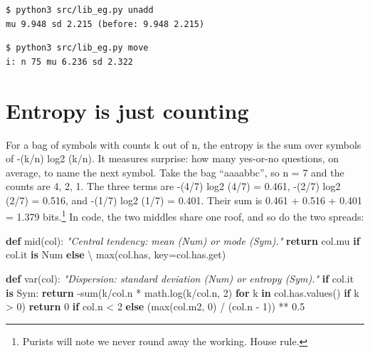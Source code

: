 \documentclass[
  justified]{tufte-book}
\newenvironment{Shaded}{}{}
\newcommand{\BuiltInTok}[1]{\textcolor[rgb]{0.00,0.50,0.00}{#1}}
\newcommand{\CommentTok}[1]{\textcolor[rgb]{0.38,0.63,0.69}{\textit{#1}}}
\newcommand{\ControlFlowTok}[1]{\textcolor[rgb]{0.00,0.44,0.13}{\textbf{#1}}}
\newcommand{\DecValTok}[1]{\textcolor[rgb]{0.25,0.63,0.44}{#1}}
\newcommand{\FloatTok}[1]{\textcolor[rgb]{0.25,0.63,0.44}{#1}}
\newcommand{\KeywordTok}[1]{\textcolor[rgb]{0.00,0.44,0.13}{\textbf{#1}}}
\newcommand{\NormalTok}[1]{#1}
\newcommand{\OperatorTok}[1]{\textcolor[rgb]{0.40,0.40,0.40}{#1}}
\begin{document}
\begin{verbatim}
$ python3 src/lib_eg.py unadd
mu 9.948 sd 2.215 (before: 9.948 2.215)
\end{verbatim}

\begin{verbatim}
$ python3 src/lib_eg.py move
i: n 75 mu 6.236 sd 2.322
\end{verbatim}

\section{Entropy is just counting}\label{entropy-is-just-counting}

For a bag of symbols with counts k out of n, the entropy is the sum over
symbols of -(k/n) log2 (k/n). It measures surprise: how many yes-or-no
questions, on average, to name the next symbol. Take the bag
``aaaabbc'', so n = 7 and the counts are 4, 2, 1. The three terms are
-(4/7) log2 (4/7) = 0.461, -(2/7) log2 (2/7) = 0.516, and -(1/7) log2
(1/7) = 0.401. Their sum is 0.461 + 0.516 + 0.401 = 1.379
bits.\footnote{Purists will note we never round away the working. House
  rule.} In code, the two middles share one roof, and so do the two
spreads:

\begin{Shaded}
\begin{Highlighting}[]
\KeywordTok{def}\NormalTok{ mid(col):}
  \CommentTok{"Central tendency: mean (Num) or mode (Sym)."}
  \ControlFlowTok{return}\NormalTok{ col.mu }\ControlFlowTok{if}\NormalTok{ col.it }\KeywordTok{is}\NormalTok{ Num }\ControlFlowTok{else} \OperatorTok{\textbackslash{}}
         \BuiltInTok{max}\NormalTok{(col.has, key}\OperatorTok{=}\NormalTok{col.has.get)}
\end{Highlighting}
\end{Shaded}

\begin{Shaded}
\begin{Highlighting}[]
\KeywordTok{def}\NormalTok{ var(col):}
  \CommentTok{"Dispersion: standard deviation (Num) or entropy (Sym)."}
  \ControlFlowTok{if}\NormalTok{ col.it }\KeywordTok{is}\NormalTok{ Sym:}
    \ControlFlowTok{return} \OperatorTok{{-}}\BuiltInTok{sum}\NormalTok{(k}\OperatorTok{/}\NormalTok{col.n }\OperatorTok{*}\NormalTok{ math.log(k}\OperatorTok{/}\NormalTok{col.n, }\DecValTok{2}\NormalTok{)}
                \ControlFlowTok{for}\NormalTok{ k }\KeywordTok{in}\NormalTok{ col.has.values() }\ControlFlowTok{if}\NormalTok{ k }\OperatorTok{\textgreater{}} \DecValTok{0}\NormalTok{)}
  \ControlFlowTok{return} \DecValTok{0} \ControlFlowTok{if}\NormalTok{ col.n }\OperatorTok{\textless{}} \DecValTok{2} \ControlFlowTok{else}\NormalTok{ (}\BuiltInTok{max}\NormalTok{(col.m2, }\DecValTok{0}\NormalTok{)}
                              \OperatorTok{/}\NormalTok{ (col.n }\OperatorTok{{-}} \DecValTok{1}\NormalTok{)) }\OperatorTok{**} \FloatTok{0.5}
\end{Highlighting}
\end{Shaded}
\end{document}
